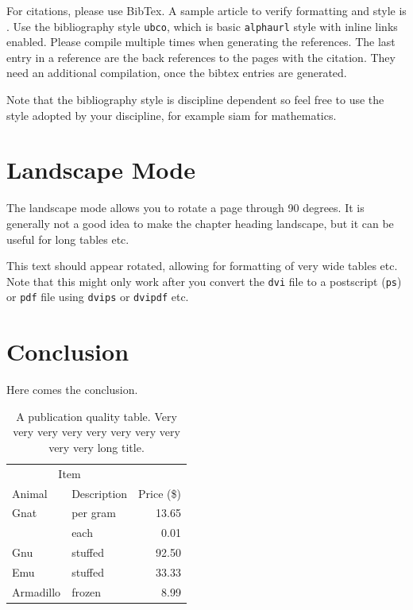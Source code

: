 \documentclass[msc,oneside]{ubcthesis}%
\begin{document}
For citations, please use BibTex. A sample article to verify formatting and style is \cite{Bauschke:2007-PA02}. Use the bibliography style \texttt{ubco}, which is basic \texttt{alphaurl} style with inline links enabled. Please compile multiple times when generating the references. The last entry in a reference are the back references to the pages with the citation. They need an additional compilation, once the bibtex entries are generated.

Note that the bibliography style is discipline dependent so feel free to use the style adopted by your discipline, for example siam for mathematics.

\chapter{Landscape Mode}
The landscape mode allows you to rotate a page through 90 degrees.  It
is generally not a good idea to make the chapter heading landscape,
but it can be useful for long tables etc.

\begin{landscape}
  This text should appear rotated, allowing for formatting of very
  wide tables etc.  Note that this might only work after you convert
  the \texttt{dvi} file to a postscript (\texttt{ps}) or \texttt{pdf}
  file using \texttt{dvips} or \texttt{dvipdf} etc.
\end{landscape}

\chapter{Conclusion}
Here comes the conclusion.
\begin{table}[tbph]
\centering
\caption{A publication quality table. Very very very very very very very very very very long title.
\label{table:food1}}
\begin{tabular}{@{}llr@{}} \toprule 
\multicolumn{2}{c}{Item} \\ \cmidrule(r){1-2} 
Animal & Description & Price (\$)\\ \midrule 
Gnat & per gram & 13.65 \\ 
& each & 0.01 \\ 
Gnu & stuffed & 92.50 \\ 
Emu & stuffed & 33.33 \\ 
Armadillo & frozen & 8.99 \\ \bottomrule 
\end{tabular}
\end{table}
\end{document}
